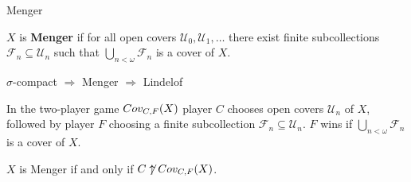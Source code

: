 



  \centerline{Menger}

  \begin{definition}
    $X$ is \textbf{Menger} if for all open covers $\mathcal{U}_0,\mathcal{U}_1,\dots$ there exist finite subcollections $\mathcal{F}_n \subseteq \mathcal{U}_n$ such that $\bigcup_{n<\omega} \mathcal{F}_n$ is a cover of $X$.
  \end{definition}

  \begin{proposition}
    $\sigma$-compact $\Rightarrow$ Menger $\Rightarrow$ Lindelof
  \end{proposition}

  \begin{definition}
    In the two-player game $Cov_{C,F}(X)$ player $C$ chooses open covers $\mathcal{U}_n$ of $X$, followed by player $F$ choosing a finite subcollection $\mathcal{F}_n\subseteq\mathcal{U}_n$. $F$ wins if $\bigcup_{n<\omega} \mathcal{F}_n$ is a cover of $X$.
  \end{definition}

  \begin{theorem}
    $X$ is Menger if and only if $C \not\uparrow Cov_{C,F}(X)$.
  \end{theorem}

